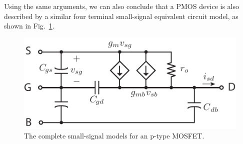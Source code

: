 Using the same arguments, we can also conclude that a PMOS device is also described by a similar four terminal small-signal equivalent circuit model, as shown in Fig.~\ref{fig:pmos4term_ac}.

\begin{figure}[h]
\begin{center}
\includegraphics[scale=1]{pmos4term_ac}
\end{center}
\caption{The complete small-signal models for an p-type MOSFET.} \label{fig:pmos4term_ac}
\end{figure}


